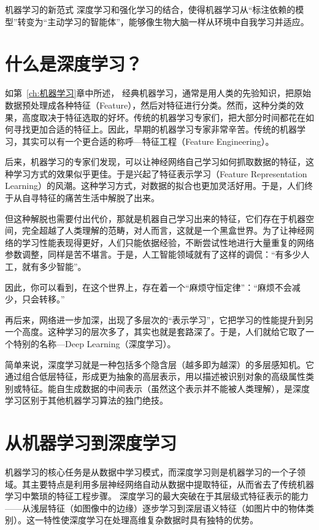 机器学习的新范式
深度学习和强化学习的结合，使得机器学习从“标注依赖的模型”转变为“主动学习的智能体”，能够像生物大脑一样从环境中自我学习并适应。


\section{什么是深度学习？}

如第~\ref{ch:机器学习}章中所述， 经典机器学习，通常是用人类的先验知识，把原始数据预处理成各种特征（Feature），然后对特征进行分类。然而，这种分类的效果，高度取决于特征选取的好坏。传统的机器学习专家们，把大部分时间都花在如何寻找更加合适的特征上。因此，早期的机器学习专家非常辛苦。传统的机器学习，其实可以有一个更合适的称呼—特征工程（Feature Engineering）。

后来，机器学习的专家们发现，可以让神经网络自己学习如何抓取数据的特征，这种学习方式的效果似乎更佳。于是兴起了特征表示学习（Feature Representation Learning）的风潮。这种学习方式，对数据的拟合也更加灵活好用。于是，人们终于从自寻特征的痛苦生活中解脱了出来。

但这种解脱也需要付出代价，那就是机器自己学习出来的特征，它们存在于机器空间，完全超越了人类理解的范畴，对人而言，这就是一个黑盒世界。为了让神经网络的学习性能表现得更好，人们只能依据经验，不断尝试性地进行大量重复的网络参数调整，同样是苦不堪言。于是，人工智能领域就有了这样的调侃：“有多少人工，就有多少智能”。

因此，你可以看到，在这个世界上，存在着一个“麻烦守恒定律”：“麻烦不会减少，只会转移。”

再后来，网络进一步加深，出现了多层次的“表示学习”，它把学习的性能提升到另一个高度。这种学习的层次多了，其实也就是套路深了。于是，人们就给它取了一个特别的名称—Deep Learning（深度学习）。

简单来说，深度学习就是一种包括多个隐含层（越多即为越深）的多层感知机。它通过组合低层特征，形成更为抽象的高层表示，用以描述被识别对象的高级属性类别或特征。能自生成数据的中间表示（虽然这个表示并不能被人类理解），是深度学习区别于其他机器学习算法的独门绝技。

\section{从机器学习到深度学习}
机器学习的核心任务是从数据中学习模式，而深度学习则是机器学习的一个子领域。其主要特点是利用多层神经网络自动从数据中提取特征，从而省去了传统机器学习中繁琐的特征工程步骤。
深度学习的最大突破在于其层级式特征表示的能力——从浅层特征（如图像中的边缘）逐步学习到深层语义特征（如图片中的物体类别）。这一特性使深度学习在处理高维复杂数据时具有独特的优势。


